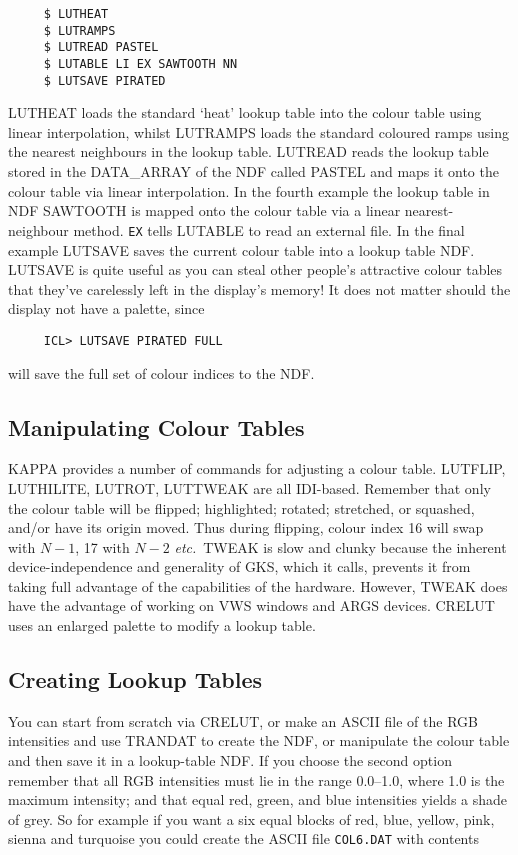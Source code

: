 {\small
\begin{verbatim}
     $ LUTHEAT
     $ LUTRAMPS
     $ LUTREAD PASTEL
     $ LUTABLE LI EX SAWTOOTH NN
     $ LUTSAVE PIRATED
\end{verbatim}
\normalsize
LUTHEAT loads the standard `heat' lookup table into the colour table
using linear interpolation, whilst LUTRAMPS loads the standard
coloured ramps using the nearest neighbours in the lookup table.
LUTREAD reads the lookup table stored in the DATA\_ARRAY of the NDF
called PASTEL and maps it onto the colour table via linear interpolation.
In the fourth example the lookup table in NDF SAWTOOTH is mapped onto the
colour table via a linear nearest-neighbour method. {\tt EX} tells
LUTABLE to read an external file.  In the final example LUTSAVE saves
the current colour table into a lookup table NDF.  LUTSAVE is quite
useful as you can steal other people's attractive colour tables that
they've carelessly left in the display's memory! It does not matter
should the display not have a palette, since

\small
\begin{verbatim}
     ICL> LUTSAVE PIRATED FULL
\end{verbatim}
\normalsize
will save the full set of colour indices to the NDF.

\subsection{Manipulating Colour Tables}
{\small KAPPA} provides a number of commands for adjusting a colour
table.  LUTFLIP, LUTHILITE, LUTROT, LUTTWEAK are all IDI-based. Remember
that only the colour table will be flipped; highlighted; rotated; stretched,
or squashed, and/or have its origin moved.
Thus during flipping, colour index 16 will swap with $N-1$, 17
with $N-2$ {\it etc.}\ TWEAK is slow and clunky because the inherent
device-independence and generality of GKS, which it calls, prevents it
from taking full advantage of the capabilities of the hardware. However,
TWEAK does have the advantage of working on VWS windows and ARGS
devices.  CRELUT uses an enlarged palette to modify a lookup table.

\subsection{Creating Lookup Tables}
You can start from scratch via CRELUT, or make an ASCII file of the
RGB intensities and use TRANDAT to create the NDF, or manipulate the colour
table and then save it in a lookup-table NDF.  If you choose the second
option remember that all RGB intensities must lie in the range 0.0--1.0,
where 1.0 is the maximum intensity; and that equal red, green, and
blue intensities yields a shade of grey.
So for example if you want a six equal blocks of red, blue, yellow,
pink, sienna and turquoise you could create the ASCII file {\tt COL6.DAT}
with contents

}
